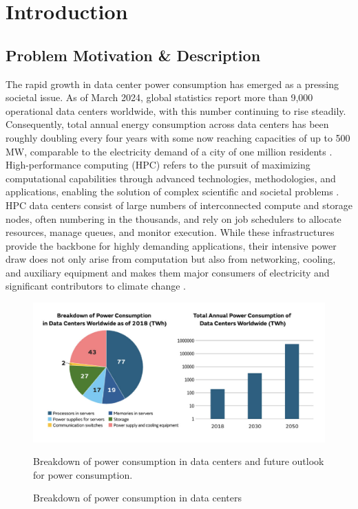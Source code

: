 \section{Introduction}
\label{cha:introduction}

\subsection{Problem Motivation \& Description}
\label{subse:problem_motivation_description}
The rapid growth in data center power consumption has emerged as a pressing societal issue. As of March 2024, global statistics report more than 9,000 operational data centers worldwide, with this number continuing to rise steadily. Consequently, total annual energy consumption across data centers has been roughly doubling every four years with some now reaching capacities of up to 500 MW, comparable to the electricity demand of a city of one million residents \cite{murata_datacenter_2025}.
High-performance computing (HPC) refers to the pursuit of maximizing computational capabilities through advanced technologies, methodologies, and applications, enabling the solution of complex scientific and societal problems \cite{STERLING201843}. HPC data centers consist of large numbers of interconnected compute and storage nodes, often numbering in the thousands, and rely on job schedulers to allocate resources, manage queues, and monitor execution. While these infrastructures provide the backbone for highly demanding applications, their intensive power draw does not only arise from computation but also from networking, cooling, and auxiliary equipment and makes them major consumers of electricity and significant contributors to climate change \cite{Silva_2024}.

\begin{figure}[H]
    \centering
    \includegraphics[scale=0.5]{fig/01/01-motivation.pdf}
    \small
    \caption{Breakdown of power consumption in data centers}
    \label{fig:01-motivation}
    \tiny
    Breakdown of power consumption in data centers and future outlook for power consumption.
\end{figure}

